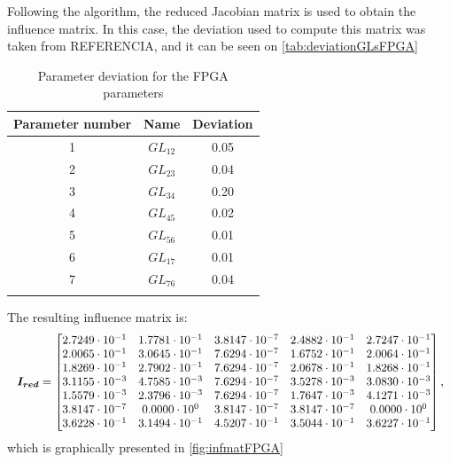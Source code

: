     
Following the algorithm, the reduced Jacobian matrix is used to obtain the influence matrix. In this case, the deviation used to compute this matrix was taken from REFERENCIA, and it can be seen on \autoref{tab:deviationGLsFPGA}

\begin{table}[H]
\centering
\caption{Parameter deviation for the FPGA parameters}
\label{tab:deviationGLsFPGA}

\begin{tabular}{c c c}
\toprule
\multicolumn{1}{c}{\textbf{Parameter number}} & \multicolumn{1}{c}{\textbf{Name}} & \multicolumn{1}{c}{\textbf{Deviation}} \\ \midrule
1 & $GL_{12}$ & 0.05 \\
2 & $GL_{23}$ & 0.04 \\
3 & $GL_{34}$ & 0.20 \\
4 & $GL_{45}$ & 0.02 \\
5 & $GL_{56}$ & 0.01 \\
6 & $GL_{17}$ & 0.01 \\
7 & $GL_{76}$ & 0.04 \\\\ \bottomrule  
\end{tabular}
\end{table}

The resulting influence matrix is:
\begin{equation}
    \resizebox{\textwidth}{!}{$\displaystyle
    \boldsymbol{I_{red}} = \begin{bmatrix}
        2.7249 \cdot 10^{-1} & 1.7781 \cdot 10^{-1} & 3.8147 \cdot 10^{-7} & 2.4882 \cdot 10^{-1} & 2.7247 \cdot 10^{-1} \\
        2.0065 \cdot 10^{-1} & 3.0645 \cdot 10^{-1} & 7.6294 \cdot 10^{-7} & 1.6752 \cdot 10^{-1} & 2.0064 \cdot 10^{-1} \\
        1.8269 \cdot 10^{-1} & 2.7902 \cdot 10^{-1} & 7.6294 \cdot 10^{-7} & 2.0678 \cdot 10^{-1} & 1.8268 \cdot 10^{-1} \\
        3.1155 \cdot 10^{-3} & 4.7585 \cdot 10^{-3} & 7.6294 \cdot 10^{-7} & 3.5278 \cdot 10^{-3} & 3.0830 \cdot 10^{-3} \\
        1.5579 \cdot 10^{-3} & 2.3796 \cdot 10^{-3} & 7.6294 \cdot 10^{-7} & 1.7647 \cdot 10^{-3} & 4.1271 \cdot 10^{-3} \\
        3.8147 \cdot 10^{-7} & 0.0000 \cdot 10^{0} & 3.8147 \cdot 10^{-7} & 3.8147 \cdot 10^{-7} & 0.0000 \cdot 10^{0} \\
        3.6228 \cdot 10^{-1} & 3.1494 \cdot 10^{-1} & 4.5207 \cdot 10^{-1} & 3.5044 \cdot 10^{-1} & 3.6227 \cdot 10^{-1} 
      \end{bmatrix},
        $}
    \label{eq:infmatFPGA}
\end{equation}
 which is graphically presented in \autoref{fig:infmatFPGA}
 
